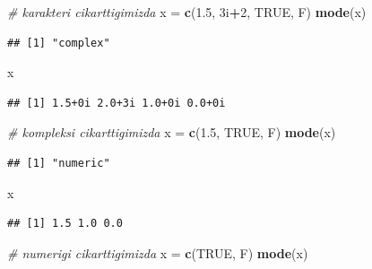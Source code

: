 \documentclass[
]{book}
\newenvironment{Shaded}{\begin{snugshade}}{\end{snugshade}}
\newcommand{\CommentTok}[1]{\textcolor[rgb]{0.56,0.35,0.01}{\textit{#1}}}
\newcommand{\DecValTok}[1]{\textcolor[rgb]{0.00,0.00,0.81}{#1}}
\newcommand{\FloatTok}[1]{\textcolor[rgb]{0.00,0.00,0.81}{#1}}
\newcommand{\KeywordTok}[1]{\textcolor[rgb]{0.13,0.29,0.53}{\textbf{#1}}}
\newcommand{\NormalTok}[1]{#1}
\newcommand{\OperatorTok}[1]{\textcolor[rgb]{0.81,0.36,0.00}{\textbf{#1}}}
\newcommand{\OtherTok}[1]{\textcolor[rgb]{0.56,0.35,0.01}{#1}}
\newcommand{\StringTok}[1]{\textcolor[rgb]{0.31,0.60,0.02}{#1}}
\begin{document}
\begin{Shaded}
\begin{Highlighting}[]
\CommentTok{\# karakteri cikarttigimizda}
\NormalTok{x =}\StringTok{ }\KeywordTok{c}\NormalTok{(}\FloatTok{1.5}\NormalTok{, 3i}\OperatorTok{+}\DecValTok{2}\NormalTok{, }\OtherTok{TRUE}\NormalTok{, F)}
\KeywordTok{mode}\NormalTok{(x)}
\end{Highlighting}
\end{Shaded}

\begin{verbatim}
## [1] "complex"
\end{verbatim}

\begin{Shaded}
\begin{Highlighting}[]
\NormalTok{x }
\end{Highlighting}
\end{Shaded}

\begin{verbatim}
## [1] 1.5+0i 2.0+3i 1.0+0i 0.0+0i
\end{verbatim}

\begin{Shaded}
\begin{Highlighting}[]
\CommentTok{\# kompleksi cikarttigimizda}
\NormalTok{x =}\StringTok{ }\KeywordTok{c}\NormalTok{(}\FloatTok{1.5}\NormalTok{, }\OtherTok{TRUE}\NormalTok{, F)}
\KeywordTok{mode}\NormalTok{(x)}
\end{Highlighting}
\end{Shaded}

\begin{verbatim}
## [1] "numeric"
\end{verbatim}

\begin{Shaded}
\begin{Highlighting}[]
\NormalTok{x}
\end{Highlighting}
\end{Shaded}

\begin{verbatim}
## [1] 1.5 1.0 0.0
\end{verbatim}

\begin{Shaded}
\begin{Highlighting}[]
\CommentTok{\# numerigi cikarttigimizda}
\NormalTok{x =}\StringTok{ }\KeywordTok{c}\NormalTok{(}\OtherTok{TRUE}\NormalTok{, F)}
\KeywordTok{mode}\NormalTok{(x)}
\end{Highlighting}
\end{Shaded}
\end{document}
